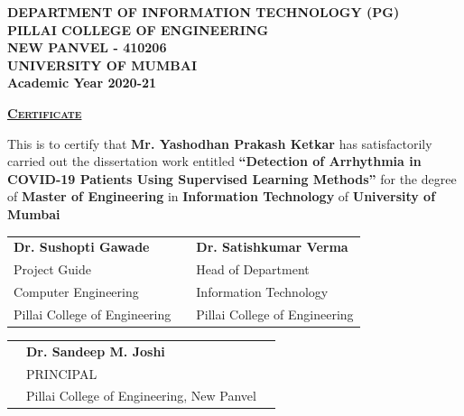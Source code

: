 \thispagestyle{empty}
{\centering\large
  \begin{figure}[h!]
    {\par}
  \end{figure}
  \vspace{0.2cm}

  {\bf
    DEPARTMENT OF INFORMATION TECHNOLOGY (PG)\\
    PILLAI COLLEGE OF ENGINEERING\\
    NEW PANVEL - 410206\\
    UNIVERSITY OF MUMBAI\\
    Academic Year 2020-21\\
  }
}

\begin{spacing}{1.2}
  \vspace{0.5cm}
  {\centering
    {\LARGE\bf\scshape
      \underline{Certificate}\\
    }
  }

  \vspace{1cm}
  \noindent
  This is to certify that \textbf{Mr. Yashodhan Prakash Ketkar} has satisfactorily carried out
  the dissertation work entitled \textbf{``Detection of Arrhythmia in COVID-19 Patients Using
    Supervised Learning Methods''} for the degree of \textbf{Master of Engineering} in
  \textbf{Information Technology} of \textbf{University of Mumbai}

  \vspace{2.5cm}
  \begin{table}[H]
    \centering
    \begin{tabularx}{\textwidth}{@{}L{13em}C{9em}R{13em}@{}}
      {\large\bf Dr. Sushopti Gawade} &  & {\large\bf Dr. Satishkumar Verma} \\
      Project Guide                   &  & Head of Department                \\
      Computer Engineering            &  & Information Technology            \\
      Pillai College of Engineering   &  & Pillai College of Engineering     \\
    \end{tabularx}
  \end{table}

  \vspace{2.5cm}
  \begin{table}[H]
    \centering
    \begin{tabularx}{\textwidth}{@{}L{6em}C{23em}R{6em}@{}}
      & {\large\bf Dr. Sandeep M. Joshi}          & \\
      & PRINCIPAL                                 & \\
      & Pillai College of Engineering, New Panvel & \\
    \end{tabularx}
  \end{table}
\end{spacing}